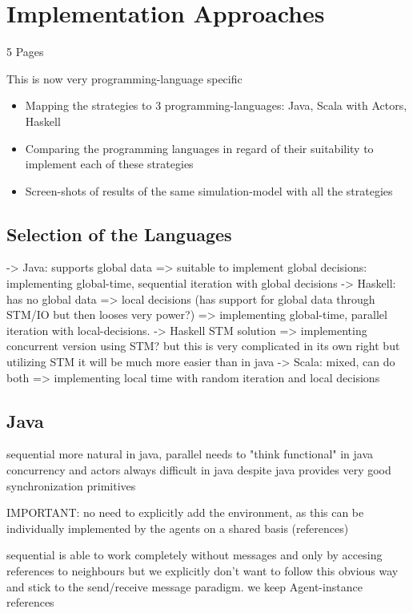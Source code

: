 \section{Implementation Approaches}
5 Pages

This is now very programming-language specific

\begin{itemize}
	\item Mapping the strategies to 3 programming-languages: Java, Scala with Actors, Haskell
	\item Comparing the programming languages in regard of their suitability to implement each of these strategies
	\item Screen-shots of results of the same simulation-model with all the strategies
\end{itemize}

\subsection{Selection of the Languages}
-> Java: supports global data => suitable to implement global decisions: implementing global-time, sequential iteration with global decisions
	-> Haskell: has no global data => local decisions (has support for global data through STM/IO but then looses very power?) => implementing global-time, parallel iteration with local-decisions. 
		-> Haskell STM solution => implementing concurrent version using STM? but this is very complicated in its own right but utilizing STM it will be much more easier than in java
	-> Scala: mixed, can do both => implementing local time with random iteration and local decisions


\subsection{Java}
sequential more natural in java,
parallel needs to "think functional" in java
concurrency and actors always difficult in java despite java provides very good synchronization primitives

IMPORTANT: no need to explicitly add the environment, as this can be individually implemented by the agents on a shared basis (references)

sequential is able to work completely without messages and only by accesing references to neighbours but we explicitly don't want to follow this obvious way and stick to the send/receive message paradigm. we keep Agent-instance references

